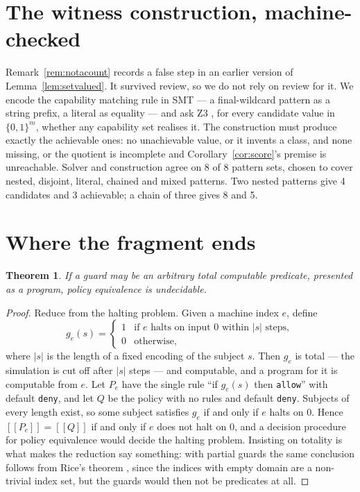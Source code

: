 \documentclass[11pt,a4paper]{article}
\theoremstyle{plain}
\newtheorem{theorem}{Theorem}
\theoremstyle{definition}
\theoremstyle{remark}
\newcommand{\sem}[1]{[\![#1]\!]}
\begin{document}
\section{The witness construction, machine-checked}
\label{sec:mechanised}

Remark~\ref{rem:notacount} records a false step in an earlier version of
Lemma~\ref{lem:setvalued}. It survived review, so we do not rely on review for it. We encode
the capability matching rule in SMT --- a final-wildcard pattern as a string prefix, a
literal as equality --- and ask Z3 \cite{z3}, for every candidate value in $\{0,1\}^m$,
whether any capability set realises it. The construction must produce exactly the achievable
ones: no unachievable value, or it invents a class, and none missing, or the quotient is
incomplete and Corollary~\ref{cor:score}'s premise is unreachable. Solver and construction
agree on 8 of 8 pattern sets, chosen to cover nested, disjoint, literal, chained and mixed
patterns. Two nested patterns give 4 candidates and 3 achievable; a chain of three
gives 8 and 5.

\section{Where the fragment ends}
\label{sec:limits}

\begin{theorem}
\label{thm:undecidable}
If a guard may be an arbitrary \emph{total} computable predicate, presented as a program,
policy equivalence is undecidable.
\end{theorem}

\begin{proof}
Reduce from the halting problem. Given a machine index $e$, define
\[
  g_e(s) = \begin{cases}
    1 & \text{if $e$ halts on input $0$ within $|s|$ steps},\\
    0 & \text{otherwise},
  \end{cases}
\]
where $|s|$ is the length of a fixed encoding of the subject $s$. Then $g_e$ is total --- the
simulation is cut off after $|s|$ steps --- and computable, and a program for it is
computable from $e$. Let $P_e$ have the single rule ``if $g_e(s)$ then \texttt{allow}'' with
default \texttt{deny}, and let $Q$ be the policy with no rules and default \texttt{deny}.
Subjects of every length exist, so some subject satisfies $g_e$ if and only if $e$ halts on
$0$. Hence $\sem{P_e} = \sem{Q}$ if and only if $e$ does not halt on $0$, and a decision
procedure for policy equivalence would decide the halting problem. Insisting on totality is
what makes the reduction say something: with partial guards the same conclusion follows from
Rice's theorem \cite{rice1953classes}, since the indices with empty domain are a non-trivial
index set, but the guards would then not be predicates at all.
\end{proof}
\end{document}
